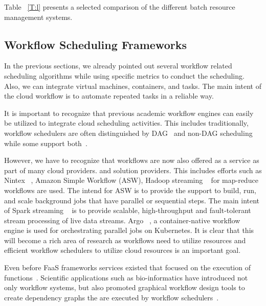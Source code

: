 \documentclass[final,5p,times,twocolumn]{elsarticle}
\newcommand{\TODO}[1]{\todo[inline]{#1}}
\begin{document}
\TODO{THE TABLE \ref{T:l} IS INCOMPLETE}

Table ~\ref{T:l} presents a selected comparison of the different batch resource management systems.
 

%




\subsection{Workflow Scheduling Frameworks} 
\label{sec:workflow}

In the previous sections, we already pointed out several workflow related scheduling algorithms while using specific metrics to conduct the scheduling. Also, we can integrate virtual machines, containers, and tasks. The main intent of the cloud workflow is to automate repeated tasks in a reliable way.

It is important to recognize that previous academic workflow engines can easily be utilized to integrate cloud scheduling activities. This includes traditionally, workflow schedulers are often distinguished by DAG~\cite{deelman2005pegasus,deelman2004pegasus,thain2005distributed} and non-DAG scheduling while some support both~\cite{las-karajan,las-cogkit-1,las06-workflow-book}.

However, we have to recognize that workflows are now also offered as a service as part of many cloud providers. and solution providers. This includes efforts such as Nintex ~\cite{www-nintex-wf}, Amazon Simple Workflow (ASW), Hadoop streaming ~\cite{www-hadoop-streaming} for map-reduce workflows are used. The intend for ASW is to provide the support to build, run, and scale background jobs that have parallel or sequential steps. The main intent of Spark streaming ~\cite{www-spark-streaming} is to provide scalable, high-throughput and fault-tolerant stream processing of live data streams. Argo ~\cite{www-argo-wf}, a container-native workflow engine is used for orchestrating parallel jobs on Kubernetes. It is clear that this will become a rich area of research as workflows need to utilize resources and efficient workflow schedulers to utilize cloud resources is an important goal.

Even before FaaS frameworks services existed that focused on the execution of functions~\cite{las-infogram}. Scientific applications such as bio-informatics have introduced not only workflow systems, but also promoted graphical workflow design tools to create dependency graphs the are executed by workflow schedulers~\cite{oinn2004taverna,tan2010comparison,yu2005taxonomy}.
 
\end{document}
